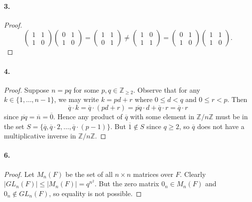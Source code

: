 \documentclass{article}
\begin{document}
\paragraph{3.}
\begin{proof}
  \[
    \begin{pmatrix}
      1 & 1 \\
      1 & 0
    \end{pmatrix}\begin{pmatrix}
      0 & 1 \\
      1 & 0
    \end{pmatrix} = \begin{pmatrix}
      1 & 1 \\
      0 & 1
    \end{pmatrix} \neq \begin{pmatrix}
      1 & 0 \\
      1 & 1
    \end{pmatrix} = \begin{pmatrix}
      0 & 1 \\
      1 & 0
    \end{pmatrix}\begin{pmatrix}
      1 & 1 \\
      1 & 0
    \end{pmatrix}.
  \]
\end{proof}

\paragraph{4.}
\begin{proof}
  Suppose $n = pq$ for some $p, q \in \mathbb{Z}_{\geq 2}$. Observe that for any
  $k \in \{1, \ldots, n-1\}$, we may write $k = pd + r$ where $0 \leq d < q$ and
  $0 \leq r < p$. Then \[
    \overline{q} \cdot k = \overline{q} \cdot (pd + r) = \overline{pq} \cdot d +
    \overline{q} \cdot r = \overline{q} \cdot r
  \] since $\overline{pq} = \overline{n} = \overline{0}$. Hence any product of
  $\overline{q}$ with some element in $\mathbb{Z}/n\mathbb{Z}$ must be in the
  set $S = \{\overline{q}, \overline{q} \cdot 2, \ldots, \overline{q} \cdot
  (p-1)\}$. But $\overline{1} \not\in S$ since $q \geq 2$, so $\overline{q}$
  does not have a multiplicative inverse in $\mathbb{Z}/n\mathbb{Z}$.
\end{proof}

\paragraph{6.}
\begin{proof}
  Let $M_n(F)$ be the set of all $n \times n$ matrices over $F$. Clearly
  $|GL_n(F)| \leq |M_n(F)| = q^{n^2}$. But the zero matrix $0_n \in M_n(F)$ and
  $0_n \not\in GL_n(F)$, so equality is not possible.
\end{proof}
\end{document}
